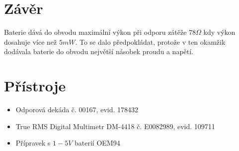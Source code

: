 \documentclass[12pt]{article} %
\begin{document}
\section{Závěr}
Baterie dává do obvodu maximální výkon při odporu zátěže $78\Omega$ kdy výkon dosahuje více než $5mW$. To se dalo předpokládat, protože v ten okamžik dodávala baterie do obvodu největší násobek proudu a napětí.

\section{Přístroje}
\begin{itemize}
\item Odporová dekáda č. 00167, evid. 178432
\item True RMS Digital Multimetr DM-4418 č. E0082989, evid. 109711
\item Přípravek s $1-5V$ baterií  OEM94
\end{itemize}
\end{document}
